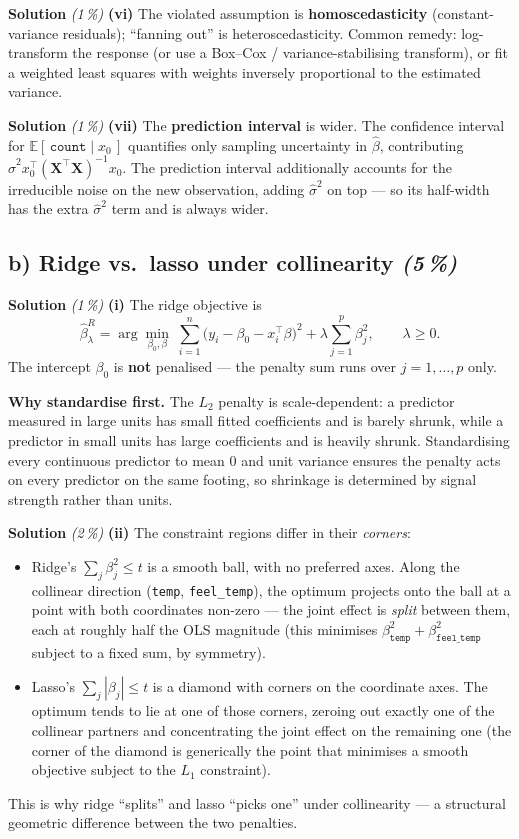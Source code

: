 \documentclass[11pt,a4paper]{article}
\newcommand{\subpoints}[1]{\textit{(#1\,\%)}}
\newcommand{\sol}{\noindent\textbf{Solution}}
\begin{document}
\medskip
\sol{} \subpoints{1} \textbf{(vi)} The violated assumption is \textbf{homoscedasticity}
(constant-variance residuals); ``fanning out'' is heteroscedasticity. Common remedy: log-transform
the response (or use a Box--Cox / variance-stabilising transform), or fit a weighted least squares
with weights inversely proportional to the estimated variance.

\medskip
\sol{} \subpoints{1} \textbf{(vii)} The \textbf{prediction interval} is wider. The confidence
interval for $\mathbb E[\,\texttt{count}\mid x_0\,]$ quantifies only sampling uncertainty in
$\hat\beta$, contributing $\hat\sigma^2 x_0^\top(\mathbf X^\top\mathbf X)^{-1}x_0$. The prediction
interval additionally accounts for the irreducible noise on the new observation, adding
$\hat\sigma^2$ on top --- so its half-width has the extra $\hat\sigma^2$ term and is always wider.

\subsection*{b) Ridge vs.\ lasso under collinearity \subpoints{5}}

\sol{} \subpoints{1} \textbf{(i)} The ridge objective is
$$\boxed{\;\hat\beta^R_\lambda = \arg\!\min_{\beta_0,\beta}\;
   \sum_{i=1}^n\bigl(y_i - \beta_0 - x_i^\top\beta\bigr)^2
   + \lambda \sum_{j=1}^p \beta_j^2,\qquad \lambda \ge 0.\;}$$
The intercept $\beta_0$ is \textbf{not} penalised --- the penalty sum runs over $j = 1, \dots, p$
only.

\textbf{Why standardise first.} The $L_2$ penalty is scale-dependent: a predictor measured in large
units has small fitted coefficients and is barely shrunk, while a predictor in small units has
large coefficients and is heavily shrunk. Standardising every continuous predictor to mean $0$ and
unit variance ensures the penalty acts on every predictor on the same footing, so shrinkage is
determined by signal strength rather than units.

\medskip
\sol{} \subpoints{2} \textbf{(ii)} The constraint regions differ in their \emph{corners}:
\begin{itemize}
  \item Ridge's $\sum_j\beta_j^2 \le t$ is a smooth ball, with no preferred axes. Along the
        collinear direction (\texttt{temp}, \texttt{feel\_temp}), the optimum projects onto the
        ball at a point with both coordinates non-zero --- the joint effect is \emph{split} between
        them, each at roughly half the OLS magnitude (this minimises $\beta_{\texttt{temp}}^2 +
        \beta_{\texttt{feel\_temp}}^2$ subject to a fixed sum, by symmetry).
  \item Lasso's $\sum_j|\beta_j| \le t$ is a diamond with corners on the coordinate axes. The
        optimum tends to lie at one of those corners, zeroing out exactly one of the collinear
        partners and concentrating the joint effect on the remaining one (the corner of the
        diamond is generically the point that minimises a smooth objective subject to the $L_1$
        constraint).
\end{itemize}
This is why ridge ``splits'' and lasso ``picks one'' under collinearity --- a structural geometric
difference between the two penalties.
\end{document}
